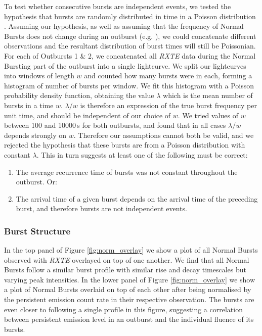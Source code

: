 \par To test whether consecutive bursts are independent events, we tested the hypothesis that bursts are randomly distributed in time in a Poisson distribution \citep{Poisson_Distribution}.  Assuming our hypothesis, as well as assuming that the frequency of Normal Bursts does not change during an outburst (e.g. \citealp{Aptekar_Recur}), we could concatenate different observations and the resultant distribution of burst times will still be Poissonian.  For each of Outbursts 1 \& 2, we concatenated all \textit{RXTE} data during the Normal Bursting part of the outburst into a single lightcurve.  We split our lightcurves into windows of length $w$ and counted how many bursts were in each, forming a histogram of number of bursts per window.  We fit this histogram with a Poisson probability density function, obtaining the value $\lambda$ which is the mean number of bursts in a time $w$.  $\lambda/w$ is therefore an expression of the true burst frequency per unit time, and should be independent of our choice of $w$.  We tried values of $w$ between 100 and 10000\,s for both outbursts, and found that in all cases $\lambda/w$ depends strongly on $w$.  Therefore our assumptions cannot both be valid, and we rejected the hypothesis that these bursts are from a Poisson distribution with constant $\lambda$.  This in turn suggests at least one of the following must be correct:
\begin{enumerate}
\item The average recurrence time of bursts was not constant throughout the outburst.  Or:
\item The arrival time of a given burst depends on the arrival time of the preceding burst, and therefore bursts are not independent events.
\end{enumerate}

\subsubsection{Burst Structure}

\label{sec:struc}

\par In the top panel of Figure \ref{fig:norm_overlay} we show a plot of all Normal Bursts observed with \textit{RXTE} overlayed on top of one another.  We find that all Normal Bursts follow a similar burst profile with similar rise and decay timescales but varying peak intensities.  In the lower panel of Figure \ref{fig:norm_overlay} we show a plot of Normal Bursts overlaid on top of each other after being normalised by the persistent emission count rate in their respective observation.  The bursts are even closer to following a single profile in this figure, suggesting a correlation between persistent emission level in an outburst and the individual fluence of its bursts.

